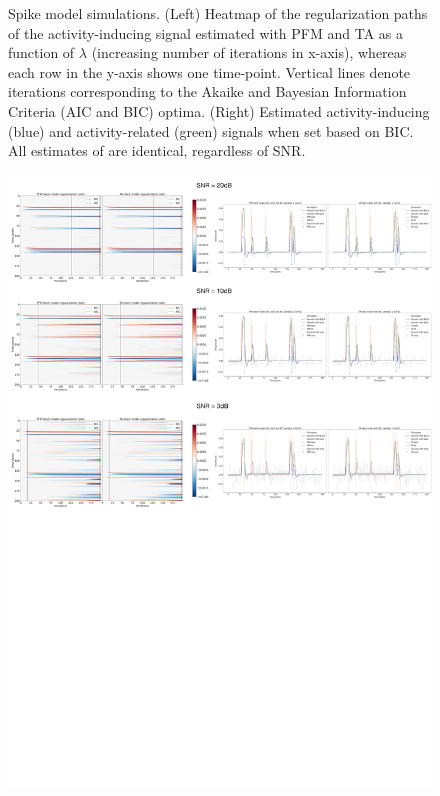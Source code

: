 \begin{figure}[h!]
\begin{center}
    \end{center}
    \caption{Spike model simulations. (Left) Heatmap of the regularization paths of the activity-inducing signal estimated with PFM and TA as a function of \(\lambda\) (increasing number of iterations in x-axis), whereas each row in the y-axis shows one time-point. Vertical lines denote iterations corresponding to the Akaike and Bayesian Information Criteria (AIC and BIC) optima. (Right) Estimated activity-inducing (blue) and activity-related (green) signals when set based on BIC. All estimates of are identical, regardless of SNR.}
\label{fig:path_spike}
\end{figure}

\begin{figure}[h!]
    \begin{center}
        \includegraphics[width=\textwidth]{figures/regpath_block.pdf}

\end{center}
\end{figure}
